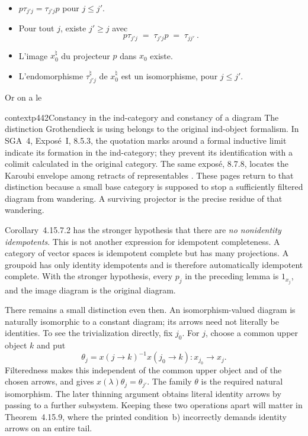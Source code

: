 \begin{itemize}
\item[1°)] $p\tau_{j'j} = \tau_{j'j}p$ pour $j \leqslant j'$.
\item[2°)] Pour tout $j$, existe $j' \geqslant j$ avec
\[
p\tau_{j'j} \;=\; \tau_{j'j}p \;=\; \tau_{jj'}\ . %
\]
\item[3°)] L'image $x_0^\natural$ du projecteur $p$ dans $x_0$ existe.
\item[4°)] L'endomorphisme $\tau^\natural_{j'j}$ de $x_0^\natural$ est un isomorphisme, pour $j \leqslant j'$.
\end{itemize}
Or on a le

\begin{dcomment}{context}{p442}{Constancy in the ind-category and constancy of a diagram}
The distinction Grothendieck is using belongs to the original ind-object formalism. In SGA~4, Expos\'e~I, 8.5.3, the quotation marks around a formal inductive limit indicate its formation in the ind-category; they prevent its identification with a colimit calculated in the original category. The same expos\'e, 8.7.8, locates the Karoubi envelope among retracts of representables \citep{SGA4I1972}. These pages return to that distinction because a small base category is supposed to stop a sufficiently filtered diagram from wandering. A surviving projector is the precise residue of that wandering.

Corollary~4.15.7.2 has the stronger hypothesis that there are \emph{no nonidentity idempotents}. This is not another expression for idempotent completeness. A category of vector spaces is idempotent complete but has many projections. A groupoid has only identity idempotents and is therefore automatically idempotent complete. With the stronger hypothesis, every $p_j$ in the preceding lemma is $1_{x_j}$, and the image diagram is the original diagram.

There remains a small distinction even then. An isomorphism-valued diagram is naturally isomorphic to a constant diagram; its arrows need not literally be identities. To see the trivialization directly, fix $j_0$. For $j$, choose a common upper object $k$ and put
\[
\theta_j=x(j\to k)^{-1}x(j_0\to k):x_{j_0}\longrightarrow x_j.
\]
Filteredness makes this independent of the common upper object and of the chosen arrows, and gives $x(\lambda)\theta_j=\theta_{j'}$. The family $\theta$ is the required natural isomorphism. The later thinning argument obtains literal identity arrows by passing to a further subsystem. Keeping these two operations apart will matter in Theorem~4.15.9, where the printed condition~b) incorrectly demands identity arrows on an entire tail.
\end{dcomment}


